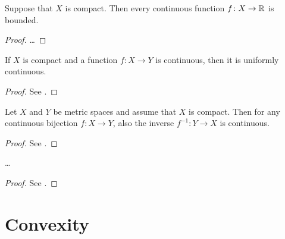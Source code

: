 \begin{theorem}
  \label{thm:continuous_on_compact_implies_bounded}
  Suppose that $X$ is compact.
  Then every continuous function $f \colon X \to \mathbb{R}$
  is bounded.
\end{theorem}
\begin{proof}
  \ldots
\end{proof}

\begin{lemma}
  \label{lem:on_compact_continuous_implies_uniformly_continuous}
  If $X$ is compact and a function $f \colon X \to Y$ is continuous, then it is uniformly continuous.
\end{lemma}
\begin{proof}
  See \MetSpCourse{}.
\end{proof}

\begin{lemma}
  \label{lem:continuous_bijection_homeomorphism}
  Let $X$ and $Y$ be metric spaces and assume that $X$ is compact.
  Then for any continuous bijection $f \colon X \to Y$,
  also the inverse $f^{-1} \colon Y \to X$ is continuous.
\end{lemma}
\begin{proof}
  See \MetSpCourse{}.
\end{proof}

\begin{theorem}
  \label{thm:intersect_nested_compacts}
  \ldots
\end{theorem}
\begin{proof}
  See \MetSpCourse{}.
\end{proof}

\section{Convexity}
